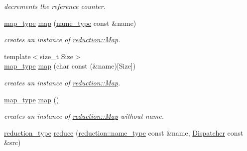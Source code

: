 \begin{DoxyCompactItemize}
\begin{DoxyCompactList}\small\item\em decrements the reference counter. \end{DoxyCompactList}\item 
\hyperlink{namespacehryky_1_1reduction_a64228de3f2cff9ed9d5ad836a120c7f7}{map\-\_\-type} \hyperlink{namespacehryky_1_1reduction_ac5eae270cf8047b294dc4ff3e5e11a79}{map} (\hyperlink{namespacehryky_1_1reduction_ac686c30a4c8d196bbd0f05629a6b921f}{name\-\_\-type} const \&name)
\begin{DoxyCompactList}\small\item\em creates an instance of \hyperlink{classhryky_1_1reduction_1_1_map}{reduction\-::\-Map}. \end{DoxyCompactList}\item 
\hypertarget{namespacehryky_1_1reduction_a8890878dbfd9285f3bcf01697eb33787}{{\footnotesize template$<$size\-\_\-t Size$>$ }\\\hyperlink{namespacehryky_1_1reduction_a64228de3f2cff9ed9d5ad836a120c7f7}{map\-\_\-type} \hyperlink{namespacehryky_1_1reduction_a8890878dbfd9285f3bcf01697eb33787}{map} (char const (\&name)\mbox{[}Size\mbox{]})}\label{namespacehryky_1_1reduction_a8890878dbfd9285f3bcf01697eb33787}

\begin{DoxyCompactList}\small\item\em creates an instance of \hyperlink{classhryky_1_1reduction_1_1_map}{reduction\-::\-Map}. \end{DoxyCompactList}\item 
\hyperlink{namespacehryky_1_1reduction_a64228de3f2cff9ed9d5ad836a120c7f7}{map\-\_\-type} \hyperlink{namespacehryky_1_1reduction_a10afad7c7c8fb32b7eca8505f4c3f586}{map} ()
\begin{DoxyCompactList}\small\item\em creates an instance of \hyperlink{classhryky_1_1reduction_1_1_map}{reduction\-::\-Map} without name. \end{DoxyCompactList}\item 
\hypertarget{namespacehryky_1_1reduction_a064022926c530d18aeb1b2abdf71800b}{\hyperlink{namespacehryky_a343a9a4c36a586be5c2693156200eadc}{reduction\-\_\-type} \hyperlink{namespacehryky_1_1reduction_a064022926c530d18aeb1b2abdf71800b}{reduce} (\hyperlink{namespacehryky_1_1reduction_ac686c30a4c8d196bbd0f05629a6b921f}{reduction\-::name\-\_\-type} const \&name, \hyperlink{classhryky_1_1reduction_1_1_dispatcher}{Dispatcher} const \&src)}\label{namespacehryky_1_1reduction_a064022926c530d18aeb1b2abdf71800b}


\end{DoxyCompactItemize}
